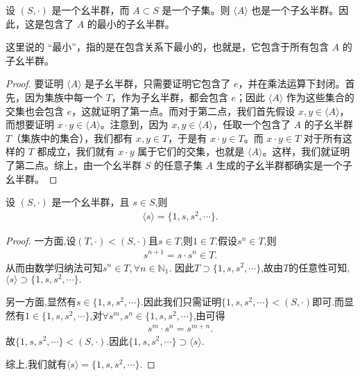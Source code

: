 \documentclass[../../main.tex]{subfiles}
\begin{document}
\begin{proposition}[由子集生成的子幺半群是包含了这个子集的最小的子幺半群]
设 $(S, \cdot)$ 是一个幺半群，而 $A \subset S$ 是一个子集。则 $\langle A \rangle$ 也是一个子幺半群。因此，这是包含了 $A$ 的最小的子幺半群。
\end{proposition}
\begin{remark}
这里说的 “最小”，指的是在包含关系下最小的，也就是，它包含于所有包含 $A$ 的子幺半群。
\end{remark}
\begin{proof}
要证明 $\langle A \rangle$ 是子幺半群，只需要证明它包含了 $e$，并在乘法运算下封闭。首先，因为集族中每一个 $T$，作为子幺半群，都会包含 $e$；因此 $\langle A \rangle$ 作为这些集合的交集也会包含 $e$，这就证明了第一点。而对于第二点，我们首先假设 $x, y \in \langle A \rangle$，而想要证明 $x \cdot y \in \langle A \rangle$。注意到，因为 $x, y \in \langle A \rangle$，任取一个包含了 $A$ 的子幺半群 $T$（集族中的集合），我们都有 $x, y \in T$，于是有 $x \cdot y \in T$。而 $x \cdot y \in T$ 对于所有这样的 $T$ 都成立，我们就有 $x \cdot y$ 属于它们的交集，也就是 $\langle A \rangle$。这样，我们就证明了第二点。综上，由一个幺半群 $S$ 的任意子集 $A$ 生成的子幺半群都确实是一个子幺半群。 
\end{proof}

\begin{proposition}\label{proposition:由单个元素生成的子幺半群的集合表示}
设 $(S, \cdot)$ 是一个幺半群，且 $s \in S$,则
\begin{align*}
\langle s\rangle =\{1,s,s^2,\cdots\}.
\end{align*} 
\end{proposition}
\begin{proof}
一方面,设$(T,\cdot)<(S,\cdot)$且$s\in T$,则$1\in T$.假设$s^n\in T$,则
\begin{align*}
s^{n+1}=s\cdot s^n\in T.
\end{align*}
从而由数学归纳法可知$s^n\in T,\forall n\in \mathbb{N}_1$.
因此$T\supset \{1,s,s^2,\cdots\}$,故由$T$的任意性可知,$\langle s\rangle\supset \{1,s,s^2,\cdots\}.$

另一方面,显然有$s\in \{1,s,s^2,\cdots\}$.因此我们只需证明$\{1,s,s^2,\cdots\}<(S,\cdot)$即可.而显然有$1\in \{1,s,s^2,\cdots\}$,对$\forall s^m,s^n\in \{1,s,s^2,\cdots\}$,由可得
\begin{align*}
s^m\cdot s^n=s^{m+n}.
\end{align*}
故$\{1,s,s^2,\cdots\}<(S,\cdot)$.因此$\{1,s,s^2,\cdots\}\supset \langle s\rangle.$

综上,我们就有$\langle s\rangle =\{1,s,s^2,\cdots\}.$
\end{proof}
\end{document}
